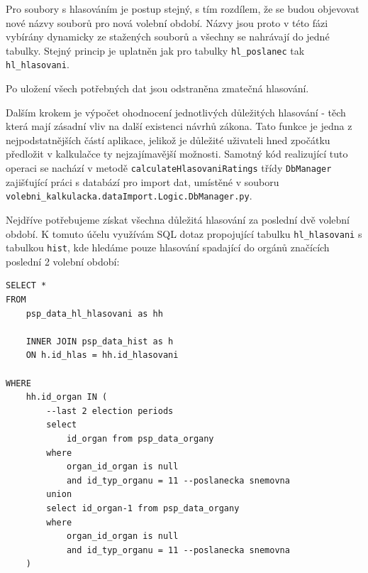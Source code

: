 \par Pro soubory s hlasováním je postup stejný, s tím rozdílem, že se budou objevovat nové názvy souborů pro nová volební období. Názvy jsou proto v této fázi vybírány dynamicky ze stažených souborů a všechny se nahrávají do jedné tabulky. Stejný princip je uplatněn jak pro tabulky \texttt{hl\_poslanec} tak \texttt{hl\_hlasovani}.\\

\par Po uložení všech potřebných dat jsou odstraněna zmatečná hlasování.\\ 

\par Dalším krokem je výpočet ohodnocení jednotlivých důležitých hlasování - těch která mají zásadní vliv na další existenci návrhů zákona. Tato funkce je jedna z nejpodstatnějších částí aplikace, jelikož je důležité uživateli hned zpočátku předložit v kalkulačce ty nejzajímavější možnosti. Samotný kód realizující tuto operaci se nachází v metodě \texttt{calculateHlasovaniRatings} třídy \texttt{DbManager} zajišťující práci s databází pro import dat, umístěné v souboru \texttt{volebni\_kalkulacka.dataImport.Logic.DbManager.py}. 
\par Nejdříve potřebujeme získat všechna důležitá hlasování za poslední dvě volební období. K tomuto účelu využívám SQL dotaz propojující tabulku \texttt{hl\_hlasovani} s tabulkou \texttt{hist}, kde hledáme pouze hlasování spadající do orgánů značících poslední 2 volební období:

\begin{verbatim}
SELECT * 
FROM 
    psp_data_hl_hlasovani as hh

    INNER JOIN psp_data_hist as h
    ON h.id_hlas = hh.id_hlasovani

WHERE 
    hh.id_organ IN (
        --last 2 election periods
        select 
            id_organ from psp_data_organy 
        where 
            organ_id_organ is null
            and id_typ_organu = 11 --poslanecka snemovna
        union
        select id_organ-1 from psp_data_organy 
        where 
            organ_id_organ is null
            and id_typ_organu = 11 --poslanecka snemovna
    )
\end{verbatim}

